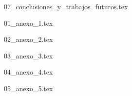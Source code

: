 \documentclass[hidelinks, headlogo, framedcover]{tfeEPCC}
\begin{document}
{07_conclusiones_y_trabajos_futuros.tex}


\startappendices
\newpage
\null%
\thispagestyle{empty}
\newpage

{01_anexo_1.tex}
\newpage
\null%
\thispagestyle{empty}
\newpage

{02_anexo_2.tex}

{03_anexo_3.tex}
\newpage
\null%
\thispagestyle{empty}
\newpage

{04_anexo_4.tex}

{05_anexo_5.tex}

\end{document}

